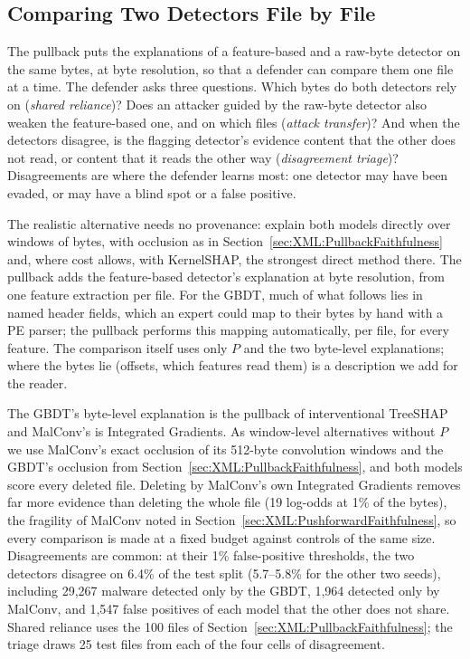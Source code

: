 \subsection{Comparing Two Detectors File by File}
\label{sec:XML:Comparison}

The pullback puts the explanations of a feature-based and a raw-byte detector on the same bytes, at byte resolution, so
that a defender can compare them one file at a time. The defender asks three questions. Which bytes do both detectors
rely on (\emph{shared reliance})? Does an attacker guided by the raw-byte detector also weaken the feature-based one, and
on which files (\emph{attack transfer})? And when the detectors disagree, is the flagging detector's evidence content
that the other does not read, or content that it reads the other way (\emph{disagreement triage})? Disagreements are
where the defender learns most: one detector may have been evaded, or may have a blind spot or a false positive.

The realistic alternative needs no provenance: explain both models directly over windows of bytes, with occlusion as in
Section~\ref{sec:XML:PullbackFaithfulness} and, where cost allows, with KernelSHAP, the strongest direct method there. The pullback adds the feature-based detector's explanation at byte
resolution, from one feature extraction per file. For the GBDT, much of what follows lies in named header fields, which
an expert could map to their bytes by hand with a PE parser; the pullback performs this mapping automatically, per file,
for every feature. The comparison itself uses only $P$ and the two byte-level explanations; where the bytes lie
(offsets, which features read them) is a description we add for the reader.

The GBDT's byte-level explanation is the pullback of interventional TreeSHAP and MalConv's is Integrated Gradients.
As window-level alternatives without $P$ we use MalConv's exact occlusion of its 512-byte convolution windows and the
GBDT's occlusion from Section~\ref{sec:XML:PullbackFaithfulness}, and both models score every deleted file. Deleting
by MalConv's own Integrated Gradients removes far more evidence than deleting the whole file (19 log-odds at 1\% of the
bytes), the fragility of MalConv noted in Section~\ref{sec:XML:PushforwardFaithfulness}, so every comparison is made
at a fixed budget against controls of the same size.
Disagreements are common: at their 1\% false-positive thresholds, the two detectors disagree on 6.4\% of the test split
(5.7--5.8\% for the other two seeds), including 29{,}267 malware detected only by the GBDT, 1{,}964 detected only by
MalConv, and 1{,}547 false positives of each model that the other does not share. Shared reliance uses the 100 files of
Section~\ref{sec:XML:PullbackFaithfulness}; the triage draws 25 test files from each of the four cells of
disagreement.


